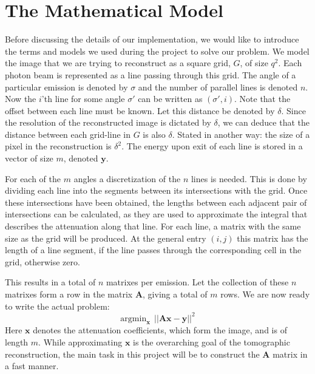 \section{The Mathematical Model}
Before discussing the details of our implementation, we would like to introduce the terms and models we used during the project to solve our problem.
We model the image that we are trying to reconstruct as a square grid, $G$, of size $q^2$. Each photon beam is represented as a line passing through this grid. The angle of a particular emission is denoted by $\sigma$ and the number of parallel lines is denoted $n$. Now the $i$'th line for some angle $\sigma'$ can be written as $(\sigma', i)$. Note that the offset between each line must be known. Let this distance be denoted by $\delta$. Since the resolution of the reconstructed image is dictated by $\delta$, we can deduce that the distance between each grid-line in $G$ is also $\delta$. Stated in another way: the size of a pixel in the reconstruction is $\delta^2$. The energy upon exit of each line is stored in a vector of size $m$, denoted $\mathbf{y}$.

For each of the $m$ angles a discretization of the $n$ lines is needed. This is done by dividing each line into the segments between its intersections with the grid. Once these intersections have been obtained, the lengths between each adjacent pair of intersections can be calculated, as they are used to approximate the integral that describes the attenuation along that line. For each line, a matrix with the same size as the grid will be produced. At the general entry $(i,j)$ this matrix has the length of a line segment, if the line passes through the corresponding cell in the grid, otherwise zero. 

This results in a total of $n$ matrixes per emission. Let the collection of these $n$ matrixes form a row in the matrix $\mathbf{A}$, giving a total of $m$ rows. We are now ready to write the actual problem:
$$
  \text{argmin}_{\mathbf{x}} ~~ || \mathbf{Ax} - \mathbf{y} ||^{2}
$$
Here $\mathbf{x}$ denotes the attenuation coefficients, which form the image, and is of length $m$.
While approximating $\mathbf{x}$ is the overarching goal of the tomographic reconstruction, the main task in this project will be to construct the $\mathbf{A}$ matrix in a fast manner.\\

